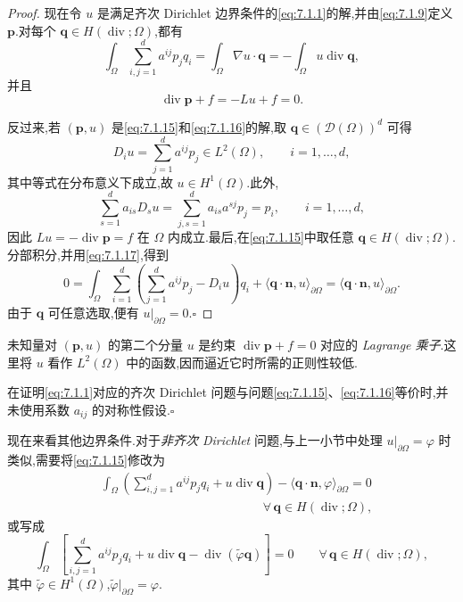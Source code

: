 \begin{proof}
现在令 \(u\) 是满足齐次 Dirichlet 边界条件的\eqref{eq:7.1.1}的解,并由\eqref{eq:7.1.9}定义 \(\boldsymbol{p}\).对每个 \(\boldsymbol{q}\in H(\operatorname{div};\Omega)\),都有
\[
  \int_\Omega\sum_{i,j=1}^d a^{ij}p_jq_i
    =\int_\Omega\nabla u\cdot\boldsymbol{q}=-\int_\Omega u\operatorname{div}\boldsymbol{q},
\]
并且
\[
  \operatorname{div}\boldsymbol{p}+f=-Lu+f=0.
\]

反过来,若 \((\boldsymbol{p},u)\) 是\eqref{eq:7.1.15}和\eqref{eq:7.1.16}的解,取 \(\boldsymbol{q}\in(\mathcal D(\Omega))^d\) 可得
\begin{equation}\label{eq:7.1.17}
  D_iu=\sum_{j=1}^d a^{ij}p_j\in L^2(\Omega),\qquad i=1,\ldots,d,
\end{equation}
其中等式在分布意义下成立,故 \(u\in H^1(\Omega)\).此外,
\[
  \sum_{s=1}^d a_{is}D_su=\sum_{j,s=1}^d a_{is}a^{sj}p_j=p_i,\qquad i=1,\ldots,d,
\]
因此 \(Lu=-\operatorname{div}\boldsymbol{p}=f\) 在 \(\Omega\) 内成立.最后,在\eqref{eq:7.1.15}中取任意 \(\boldsymbol{q}\in H(\operatorname{div};\Omega)\).分部积分,并用\eqref{eq:7.1.17},得到
\[
  0=\int_\Omega\sum_{i=1}^d\left(\sum_{j=1}^d a^{ij}p_j-D_iu\right)q_i
    +\langle\boldsymbol{q}\cdot\boldsymbol{n},u\rangle_{\partial\Omega}
    =\langle\boldsymbol{q}\cdot\boldsymbol{n},u\rangle_{\partial\Omega}.
\]
由于 \(\boldsymbol{q}\) 可任意选取,便有 \(u|_{\partial\Omega}=0\).\hfill\(\square\)
\end{proof}

未知量对 \((\boldsymbol{p},u)\) 的第二个分量 \(u\) 是约束 \(\operatorname{div}\boldsymbol{p}+f=0\) 对应的 \emph{Lagrange 乘子}.这里将 \(u\) 看作 \(L^2(\Omega)\) 中的函数,因而逼近它时所需的正则性较低.

\begin{note}
在证明\eqref{eq:7.1.1}对应的齐次 Dirichlet 问题与问题\eqref{eq:7.1.15}、\eqref{eq:7.1.16}等价时,并未使用系数 \(a_{ij}\) 的对称性假设.\hfill\(\square\)
\end{note}

现在来看其他边界条件.对于\emph{非齐次 Dirichlet} 问题,与上一小节中处理 \(u|_{\partial\Omega}=\varphi\) 时类似,需要将\eqref{eq:7.1.15}修改为
\begin{equation}\label{eq:7.1.18}
  \begin{aligned}
    &\int_\Omega\left(\sum_{i,j=1}^d a^{ij}p_jq_i+u\operatorname{div}\boldsymbol{q}\right)
        -\langle\boldsymbol{q}\cdot\boldsymbol{n},\varphi\rangle_{\partial\Omega}=0\\
    &\hspace{13em}\forall\,\boldsymbol{q}\in H(\operatorname{div};\Omega),
  \end{aligned}
\end{equation}
或写成
\begin{equation}\label{eq:7.1.19}
  \int_\Omega\left[\sum_{i,j=1}^d a^{ij}p_jq_i+u\operatorname{div}\boldsymbol{q}
              -\operatorname{div}(\widetilde\varphi\boldsymbol{q})\right]=0
    \qquad\forall\,\boldsymbol{q}\in H(\operatorname{div};\Omega),
\end{equation}
其中 \(\widetilde\varphi\in H^1(\Omega)\),\(\widetilde\varphi|_{\partial\Omega}=\varphi\).

